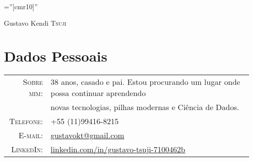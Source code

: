 \documentclass[a4paper,10pt]{article}
\begin{document}

\pagestyle{empty} %

\font\fb=''[cmr10]'' %

\par{\centering
    {\Huge Gustavo Kendi \textsc{Tsuji}
  }\bigskip\par}

\section{Dados Pessoais}

\begin{tabular}{rl}
  \textsc{Sobre mim:}   & 38 anos, casado e pai. Estou procurando um lugar onde possa continuar aprendendo \\
    & novas tecnologias, pilhas modernas e Ciência de Dados.\\
    \textsc{Telefone:}     & +55 (11)99416-8215\\
    \textsc{E-mail:}     & \href{mailto:gustavokt@gmail.com}{gustavokt@gmail.com} \\
    \textsc{LinkedIn:}     & \href{linkedin.com/in/gustavo-tsuji-7100462b}{linkedin.com/in/gustavo-tsuji-7100462b}
\end{tabular}



\end{document}
